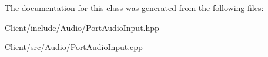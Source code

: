 The documentation for this class was generated from the following files\+:\begin{DoxyCompactItemize}
\item 
Client/include/\+Audio/Port\+Audio\+Input.\+hpp\item 
Client/src/\+Audio/Port\+Audio\+Input.\+cpp\end{DoxyCompactItemize}
